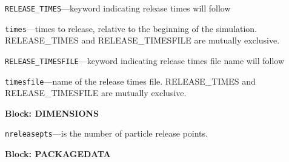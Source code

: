 \begin{description}
\item \texttt{RELEASE\_TIMES}---keyword indicating release times will follow

\item \texttt{times}---times to release, relative to the beginning of the simulation.  RELEASE\_TIMES and RELEASE\_TIMESFILE are mutually exclusive.

\item \texttt{RELEASE\_TIMESFILE}---keyword indicating release times file name will follow

\item \texttt{timesfile}---name of the release times file.  RELEASE\_TIMES and RELEASE\_TIMESFILE are mutually exclusive.

\end{description}
\item \textbf{Block: DIMENSIONS}

\begin{description}
\item \texttt{nreleasepts}---is the number of particle release points.

\end{description}
\item \textbf{Block: PACKAGEDATA}

